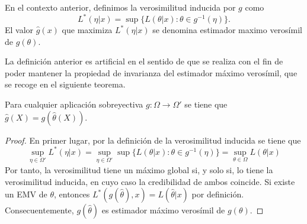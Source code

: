 \documentclass{article}
\begin{document}
    \begin{definition}
        En el contexto anterior, definimos la verosimilitud inducida por $g$ como
        \[L^*(\eta|x) = \sup\{L(\theta | x): \theta \in g^{-1}(\eta)\}.\]
        El valor $\hat{g}(x)$ que maximiza $L^*(\eta|x)$ se denomina estimador maximo verosímil de $g(\theta)$.
    \end{definition}

    La definición anterior es artificial en el sentido de que se realiza con el fin de poder mantener la propiedad de invarianza del estimador máximo verosímil, que se recoge en el siguiente teorema.

    \begin{thm}
        Para cualquier aplicación sobreyectiva $g: \Omega \to \Omega'$ se tiene que $\hat{g}(X) = g(\hat{\theta}(X))$.
    \end{thm}
    \begin{proof}
        En primer lugar, por la definición de la verosimilitud inducida se tiene que
        \[\sup_{\eta \in \Omega'} L^*(\eta|x) = \sup_{\eta \in \Omega'} \sup\{L(\theta | x): \theta \in g^{-1}(\eta)\} = \sup_{\theta \in \Omega} L(\theta | x)\]
        Por tanto, la verosimilitud tiene un máximo global si, y solo si, lo tiene la verosimilitud inducida, en cuyo caso la credibilidad de ambos coincide. Si existe un EMV de $\theta$, entonces $L^*(g(\hat{\theta}),x) = L(\hat{\theta} | x)$ por definición. Consecuentemente, $g(\hat{\theta})$ es estimador máximo verosímil de $g(\theta)$.
    \end{proof}
\end{document}
